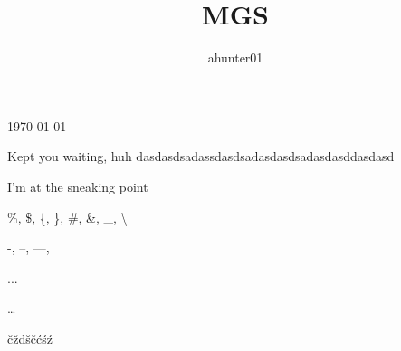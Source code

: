 \documentclass[a4paper, 12pt]{article}
\title{MGS}
\author{ahunter01}
\begin{document}
\maketitle

\today

Kept you waiting, huh
dasdasdsadassdasdsadasdasdsadasdasd\-dasdasd

I'm at the sneaking point

\%, \$, \{, \}, \#, \&, \_, \textbackslash{}

-, --, ---,

... 

\ldots 

čžđščćśź
\end{document}
